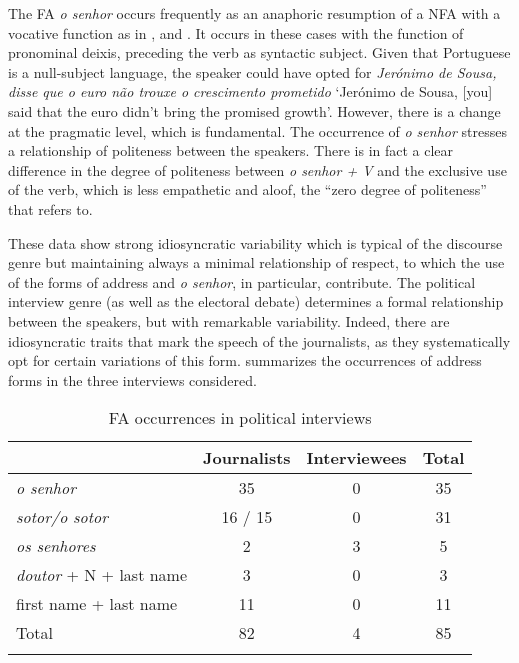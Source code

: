 \documentclass[output=paper]{langscibook}
\begin{document}
The FA \textit{o senhor} occurs frequently as an anaphoric resumption of a NFA with a vocative function as in ,  and . It occurs in these cases with the function of pronominal deixis, preceding the verb as syntactic subject. Given that Portuguese is a null-subject language, the speaker could have opted for \textit{Jerónimo de Sousa, disse que o euro não trouxe o crescimento prometido} ‘Jerónimo de Sousa, [you] said that the euro didn’t bring the promised growth’. However, there is a change at the pragmatic level, which is fundamental. The occurrence of \textit{o senhor} stresses a relationship of politeness between the speakers. There is in fact a clear difference in the degree of politeness between \textit{o senhor + V} and the exclusive use of the verb, which is less empathetic and aloof, the “zero degree of politeness” that \citet{Carreira1997} refers to.



These data show strong idiosyncratic variability which is typical of the discourse genre but maintaining always a minimal relationship of respect, to which the use of the forms of address and \textit{o senhor}, in particular, contribute. The political interview genre (as well as the electoral debate) determines a formal relationship between the speakers, but with remarkable variability. Indeed, there are idiosyncratic traits that mark the speech of the journalists, as they systematically opt for certain variations of this form.  summarizes the occurrences of address forms in the three interviews considered.


\begin{table}
\begin{tabular}{lccc}
\lsptoprule
& {{Journalists}} & {{Interviewees}} & {{Total}}\\
\midrule

{\textit{o senhor}} & {35} & {0} & {35}\\
{\textit{sotor\slash o sotor}} & {16 / 15} & {0} & {31}\\
{\textit{os senhores}} & {2} & {3} & {5}\\
{\textit{doutor} + N + last name} & {3} & {0} & {3}\\
{first name + last name} & {11} & {0} & {11}\\
\midrule
{{Total}} & {82} & {4} & {85}\\
\lspbottomrule
\end{tabular}
\caption{FA occurrences in political interviews}
\label{tab:marques:7}
\end{table}
\end{document}
